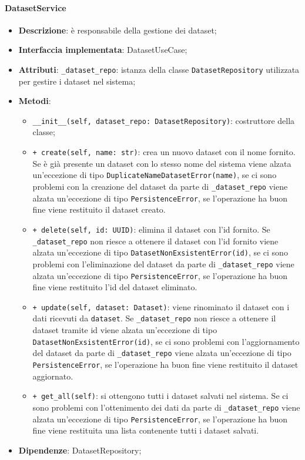 \paragraph{DatasetService}
\begin{itemize}
    \item \textbf{Descrizione}: è responsabile della gestione dei dataset;
    \item \textbf{Interfaccia implementata}: DatasetUseCase;
    \item \textbf{Attributi}: \lstinline|_dataset_repo|: istanza della classe \lstinline|DatasetRepository| utilizzata per gestire i dataset nel sistema;
    \item \textbf{Metodi}:
    \begin{itemize}
        \item \lstinline|__init__(self, dataset_repo: DatasetRepository)|: costruttore della classe;
        \item \lstinline|+ create(self, name: str)|: crea un nuovo dataset con il nome fornito.
        Se è già presente un dataset con lo stesso nome del sistema viene alzata un'eccezione di tipo \lstinline|DuplicateNameDatasetError(name)|,
        se ci sono problemi con la creazione del dataset da parte di \lstinline|_dataset_repo| viene alzata un'eccezione di tipo \lstinline|PersistenceError|,
        se l'operazione ha buon fine viene restituito il dataset creato.
        \item \lstinline|+ delete(self, id: UUID)|: elimina il dataset con l'id fornito.
        Se \lstinline|_dataset_repo| non riesce a ottenere il dataset con l'id fornito viene alzata un'eccezione di tipo \lstinline|DatasetNonExsistentError(id)|,
        se ci sono problemi con l'eliminazione del dataset da parte di \lstinline|_dataset_repo| viene alzata un'eccezione di tipo \lstinline|PersistenceError|,
        se l'operazione ha buon fine viene restituito l'id del dataset eliminato.
        \item \lstinline|+ update(self, dataset: Dataset)|: viene rinominato il dataset con i dati ricevuti da \lstinline|dataset|.
        Se \lstinline|_dataset_repo| non riesce a ottenere il dataset tramite id viene alzata un'eccezione di tipo \lstinline|DatasetNonExsistentError(id)|,
        se ci sono problemi con l'aggiornamento del dataset da parte di \lstinline|_dataset_repo| viene alzata un'eccezione di tipo \lstinline|PersistenceError|,
        se l'operazione ha buon fine viene restituito il dataset aggiornato.
        \item \lstinline|+ get_all(self)|: si ottengono tutti i dataset salvati nel sistema.
        Se ci sono problemi con l'ottenimento dei dati da parte di \lstinline|_dataset_repo| viene alzata un'eccezione di tipo \lstinline|PersistenceError|,
        se l'operazione ha buon fine viene restituita una lista contenente tutti i dataset salvati.
        
    \end{itemize}
    \item \textbf{Dipendenze}: DatasetRepository;
\end{itemize}

